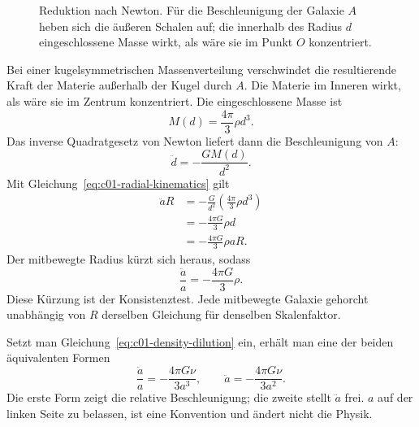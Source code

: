 \begin{figure}[ht]\centering
{}\caption{Reduktion nach Newton. Für die Beschleunigung der Galaxie \(A\) heben sich die äußeren Schalen auf; die innerhalb des Radius \(d\) eingeschlossene Masse wirkt, als wäre sie im Punkt \(O\) konzentriert.}\label{fig:c01-newton-sphere}\end{figure}

Bei einer kugelsymmetrischen Massenverteilung verschwindet die resultierende Kraft der Materie außerhalb der Kugel durch \(A\). Die Materie im Inneren wirkt, als wäre sie im Zentrum konzentriert. Die eingeschlossene Masse ist
\begin{equation}
M(d)=\frac{4\pi}{3}\rho d^3.
\label{eq:c01-enclosed-mass}
\end{equation}
Das inverse Quadratgesetz von Newton liefert dann die Beschleunigung von \(A\):
\begin{equation}
\ddot d=-\frac{GM(d)}{d^2}.
\end{equation}
Mit Gleichung~\eqref{eq:c01-radial-kinematics} gilt
\begin{align}
\ddot a R
&=-\frac{G}{d^2}\left(\frac{4\pi}{3}\rho d^3\right) \\
&=-\frac{4\pi G}{3}\rho d \\
&=-\frac{4\pi G}{3}\rho aR.
\end{align}
Der mitbewegte Radius kürzt sich heraus, sodass
\begin{equation}
\boxed{\frac{\ddot a}{a}=-\frac{4\pi G}{3}\rho.}
\label{eq:c01-acceleration}
\end{equation}
Diese Kürzung ist der Konsistenztest. Jede mitbewegte Galaxie gehorcht unabhängig von \(R\) derselben Gleichung für denselben Skalenfaktor.

Setzt man Gleichung~\eqref{eq:c01-density-dilution} ein, erhält man eine der beiden äquivalenten Formen
\begin{equation}
\frac{\ddot a}{a}=-\frac{4\pi G\nu}{3a^3},
\qquad
\ddot a=-\frac{4\pi G\nu}{3a^2}.
\label{eq:c01-acceleration-nu}
\end{equation}
Die erste Form zeigt die relative Beschleunigung; die zweite stellt \(\ddot a\) frei. \(a\) auf der linken Seite zu belassen, ist eine Konvention und ändert nicht die Physik.


